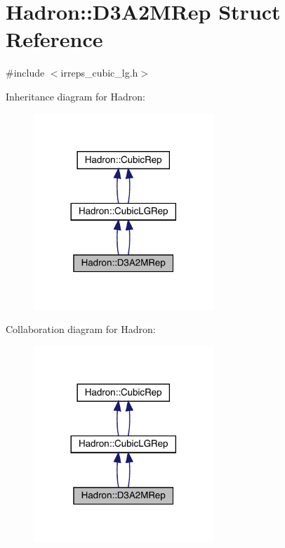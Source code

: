 \hypertarget{structHadron_1_1D3A2MRep}{}\section{Hadron\+:\+:D3\+A2\+M\+Rep Struct Reference}
\label{structHadron_1_1D3A2MRep}


{\ttfamily \#include $<$irreps\+\_\+cubic\+\_\+lg.\+h$>$}



Inheritance diagram for Hadron\+:\nopagebreak
\begin{figure}[H]
\begin{center}
\leavevmode
\includegraphics[width=192pt]{d2/d99/structHadron_1_1D3A2MRep__inherit__graph}
\end{center}
\end{figure}


Collaboration diagram for Hadron\+:\nopagebreak
\begin{figure}[H]
\begin{center}
\leavevmode
\includegraphics[width=192pt]{d6/d56/structHadron_1_1D3A2MRep__coll__graph}
\end{center}
\end{figure}

